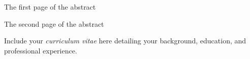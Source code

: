 \documentclass[11 pt]{report}
\begin{document}

\tableofcontents

\listoftables

\listoffigures

\abstractpage

The first page of the abstract

\abstractmultiplepage

The second page of the abstract

\startofchapters




\appendix
\appendixeqnumbering








\cvpage

\noindent Include your \emph{curriculum vitae} here detailing your background,
education, and professional experience.
\end{document}

